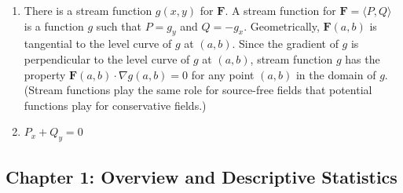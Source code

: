 \documentclass{report}
\begin{document}
\begin{itemize}
\begin{enumerate}
                \item There is a stream function \( g(x, y) \) for \( \mathbf{F} \). A stream function for \( \mathbf{F} = \langle P, Q \rangle \) is a function \( g \) such that \( P = g_y \) and \( Q = -g_x \). Geometrically, \( \mathbf{F}(a, b) \) is tangential to the level curve of \( g \) at \( (a, b) \). Since the gradient of \( g \) is perpendicular to the level curve of \( g \) at \( (a, b) \), stream function \( g \) has the property \( \mathbf{F}(a, b) \cdot \nabla g(a, b) = 0 \) for any point \( (a, b) \) in the domain of \( g \). (Stream functions play the same role for source-free fields that potential functions play for conservative fields.)
                \item \( P_x + Q_y = 0 \)
            \end{enumerate}
        \end{itemize}

    \pagebreak 
    \bigbreak \noindent 
    \subsection{Chapter 1: Overview and Descriptive Statistics}
    \bigbreak \noindent 
\end{document}
